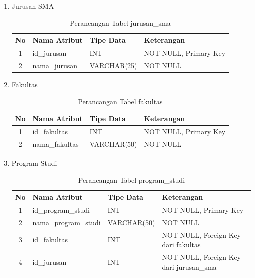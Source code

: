 \begin{enumerate}
    \item Jurusan SMA
    
        \begin{table}[H]
            \centering
            \begin{tabular}{|c|p{4cm}|p{4cm}|p{4cm}|}
                \hline
                No & Nama Atribut & Tipe Data & Keterangan \\
                \hline
                1 & id\_jurusan & INT & NOT NULL, Primary Key \\
                \hline
                2 & nama\_jurusan & VARCHAR(25) & NOT NULL\\
                \hline
            \end{tabular}
            \caption{Perancangan Tabel jurusan\_sma}
            \label{tab:perancangan tabel jurusan sma}
        \end{table}
    
    \item Fakultas
    
        \begin{table}[H]
            \centering
            \begin{tabular}{|c|p{4cm}|p{4cm}|p{4cm}|}
                \hline
                No & Nama Atribut & Tipe Data & Keterangan \\
                \hline
                1 & id\_fakultas & INT & NOT NULL, Primary Key \\
                \hline
                2 & nama\_fakultas & VARCHAR(50) & NOT NULL\\
                \hline
            \end{tabular}
            \caption{Perancangan Tabel fakultas}
            \label{tab:perancangan tabel fakultas}
        \end{table}
        
    \item Program Studi
        
        \begin{table}[H]
            \centering
            \begin{tabular}{|c|p{4cm}|p{4cm}|p{4cm}|}
                \hline
                No & Nama Atribut & Tipe Data & Keterangan \\
                \hline
                1 & id\_program\_studi & INT & NOT NULL, Primary Key \\
                \hline
                2 & nama\_program\_studi & VARCHAR(50) & NOT NULL \\
                \hline
                3 & id\_fakultas & INT & NOT NULL, Foreign Key dari fakultas \\
                \hline
                4 & id\_jurusan & INT & NOT NULL, Foreign Key dari jurusan\_sma \\
                \hline
            \end{tabular}
            \caption{Perancangan Tabel program\_studi}
            \label{tab:perancangan tabel program studi}
        \end{table}
        

\end{enumerate}
